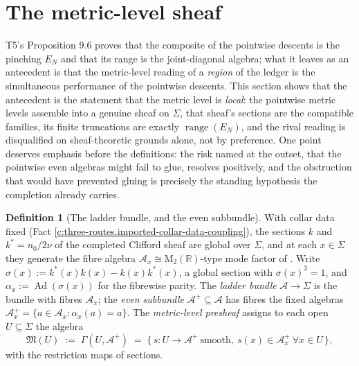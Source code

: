\documentclass[11pt]{article}
\theoremstyle{definition}
\newtheorem{definition}[theorem]{Definition}
\theoremstyle{plain}
\providecommand{\Aa}{}\renewcommand{\Aa}{\mathcal{A}}
\providecommand{\EN}{}\renewcommand{\EN}{E_{N}}
\providecommand{\Mat}{}\renewcommand{\Mat}{\mathrm{M}}
\providecommand{\R}{}\renewcommand{\R}{\mathbb{R}}
\providecommand{\Sig}{}\renewcommand{\Sig}{\Sigma}
\providecommand{\nO}{}\renewcommand{\nO}{n_0}
\begin{document}
\section{The metric-level sheaf}

\label{c:note.three-routes.setting-metric-level-sheaf}
T5's Proposition 9.6 proves that the composite of the pointwise descents is the pinching $\EN$ and that its range is the joint-diagonal algebra; what it leaves as an antecedent is that the metric-level reading of a \emph{region} of the ledger is the simultaneous performance of the pointwise descents. This section shows that the antecedent is the statement that the metric level is \emph{local}: the pointwise metric levels assemble into a genuine sheaf on $\Sig$, that sheaf's sections are the compatible families, its finite truncations are exactly $\operatorname{range}(\EN)$, and the rival reading is disqualified on sheaf-theoretic grounds alone, not by preference. One point deserves emphasis before the definitions: the risk named at the outset, that the pointwise even algebras might fail to glue, resolves positively, and the obstruction that would have prevented gluing is precisely the standing hypothesis the completion already carries.

\begin{definition}[The ladder bundle, and the even subbundle]\label{c:obj.three-routes.ladder-bundle-even-subbundle}
With collar data fixed (Fact \ref{c:three-routes.imported-collar-data-coupling}), the sections $k$ and $k^{*} = \nO/2\nu$ of the completed Clifford sheaf are global over $\Sig$, and at each $x \in \Sig$ they generate the fibre algebra $\Aa_x \cong \Mat_2(\R)$-type mode factor of \cite[Cor.~4.5]{ButlerT4}. Write $\sigma(x) := k^{*}(x)k(x) - k(x)k^{*}(x)$, a global section with $\sigma(x)^2 = 1$, and $\alpha_x := \operatorname{Ad}(\sigma(x))$ for the fibrewise parity. The \emph{ladder bundle} $\Aa \to \Sig$ is the bundle with fibres $\Aa_x$; the \emph{even subbundle} $\Aa^{+} \subseteq \Aa$ has fibres the fixed algebras $\Aa_x^{+} = \{a \in \Aa_x : \alpha_x(a) = a\}$. The \emph{metric-level presheaf} assigns to each open $U \subseteq \Sig$ the algebra
\[
\mathfrak{M}(U) \;:=\; \Gamma(U, \Aa^{+}) \;=\; \bigl\{\, s : U \to \Aa^{+} \ \text{smooth},\ s(x) \in \Aa_x^{+}\ \forall x \in U \,\bigr\},
\]
with the restriction maps of sections.
\end{definition}
\end{document}
